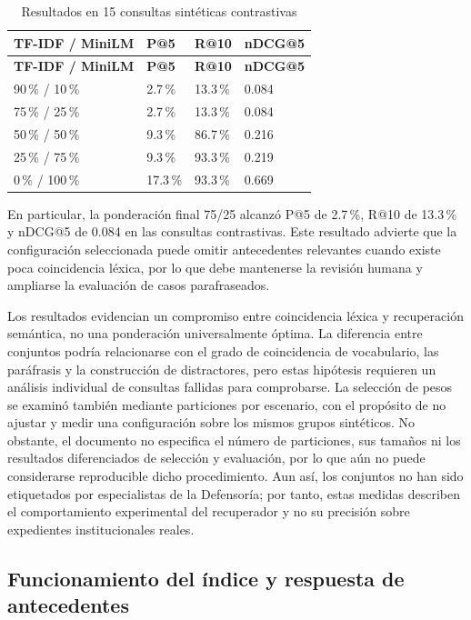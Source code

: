 \begin{longtable}{|p{3.8cm}|p{2.6cm}|p{2.6cm}|p{2.6cm}|}
\caption{Resultados en 15 consultas sintéticas contrastivas}
\label{tab:ia_pesos_contraste} \\
\hline
\textbf{TF-IDF / MiniLM} & \textbf{P@5} & \textbf{R@10} & \textbf{nDCG@5} \\
\hline
\endfirsthead
\hline
\textbf{TF-IDF / MiniLM} & \textbf{P@5} & \textbf{R@10} & \textbf{nDCG@5} \\
\hline
\endhead
90\,\% / 10\,\% & 2.7\,\% & 13.3\,\% & 0.084 \\ \hline
75\,\% / 25\,\% & 2.7\,\% & 13.3\,\% & 0.084 \\ \hline
50\,\% / 50\,\% & 9.3\,\% & 86.7\,\% & 0.216 \\ \hline
25\,\% / 75\,\% & 9.3\,\% & 93.3\,\% & 0.219 \\ \hline
0\,\% / 100\,\% & 17.3\,\% & 93.3\,\% & 0.669 \\ \hline
\end{longtable}

En particular, la ponderación final 75/25 alcanzó P@5 de 2.7\,\%,
R@10 de 13.3\,\% y nDCG@5 de 0.084 en las consultas contrastivas.
Este resultado advierte que la configuración seleccionada puede omitir
antecedentes relevantes cuando existe poca coincidencia léxica, por lo que
debe mantenerse la revisión humana y ampliarse la evaluación de casos
parafraseados.

Los resultados evidencian un compromiso entre coincidencia léxica y recuperación semántica,
no una ponderación universalmente óptima. La diferencia entre conjuntos podría
relacionarse con el grado de coincidencia de vocabulario, las paráfrasis y la
construcción de distractores, pero estas hipótesis requieren un análisis
individual de consultas fallidas para comprobarse. La selección de pesos se examinó también mediante
particiones por escenario, con el propósito de no ajustar y medir una configuración sobre los
mismos grupos sintéticos. No obstante, el documento no especifica el número de
particiones, sus tamaños ni los resultados diferenciados de selección y evaluación,
por lo que aún no puede considerarse reproducible dicho procedimiento. Aun así, los conjuntos no han sido etiquetados por especialistas
de la Defensoría; por tanto, estas medidas describen el comportamiento experimental del
recuperador y no su precisión sobre expedientes institucionales reales.

\subsection{Funcionamiento del índice y respuesta de antecedentes}
\label{sec:pruebas_ia_indice}

